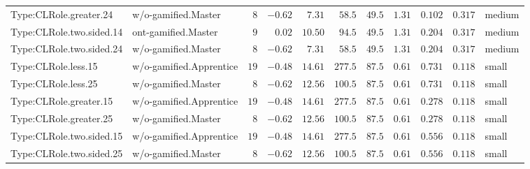 \documentclass[6pt,a4paper]{article}
\begin{document}
{\begin{longtable}{llrrrrrrrrl}
Type:CLRole.greater.24&w/o-gamified.Master&$ 8$&$-0.62$&$ 7.31$&$ 58.5$&$ 49.5$&$1.31$&$0.102$&$0.317$&medium\tabularnewline
Type:CLRole.two.sided.14&ont-gamified.Master&$ 9$&$ 0.02$&$10.50$&$ 94.5$&$ 49.5$&$1.31$&$0.204$&$0.317$&medium\tabularnewline
Type:CLRole.two.sided.24&w/o-gamified.Master&$ 8$&$-0.62$&$ 7.31$&$ 58.5$&$ 49.5$&$1.31$&$0.204$&$0.317$&medium\tabularnewline
Type:CLRole.less.15&w/o-gamified.Apprentice&$19$&$-0.48$&$14.61$&$277.5$&$ 87.5$&$0.61$&$0.731$&$0.118$&small\tabularnewline
Type:CLRole.less.25&w/o-gamified.Master&$ 8$&$-0.62$&$12.56$&$100.5$&$ 87.5$&$0.61$&$0.731$&$0.118$&small\tabularnewline
Type:CLRole.greater.15&w/o-gamified.Apprentice&$19$&$-0.48$&$14.61$&$277.5$&$ 87.5$&$0.61$&$0.278$&$0.118$&small\tabularnewline
Type:CLRole.greater.25&w/o-gamified.Master&$ 8$&$-0.62$&$12.56$&$100.5$&$ 87.5$&$0.61$&$0.278$&$0.118$&small\tabularnewline
\newpage
Type:CLRole.two.sided.15&w/o-gamified.Apprentice&$19$&$-0.48$&$14.61$&$277.5$&$ 87.5$&$0.61$&$0.556$&$0.118$&small\tabularnewline
Type:CLRole.two.sided.25&w/o-gamified.Master&$ 8$&$-0.62$&$12.56$&$100.5$&$ 87.5$&$0.61$&$0.556$&$0.118$&small\tabularnewline
\hline
\end{longtable}}
\end{document}
